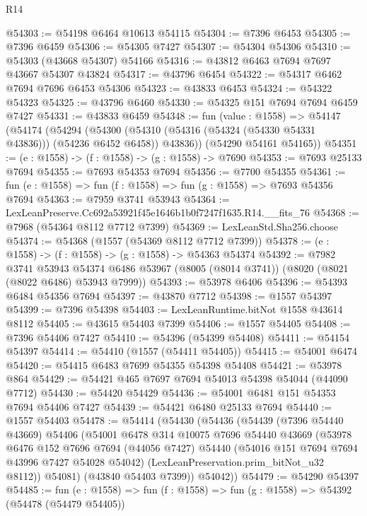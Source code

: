 \begin{lexlean}{R14}
\begin{coremodule}
@54303 := @54198 @6464 @10613 @54115
@54304 := @7396 @6453
@54305 := @7396 @6459
@54306 := @54305 @7427
@54307 := @54304 @54306
@54310 := @54303 (@43668 @54307) @54166
@54316 := @43812 @6463 @7694 @7697 @43667 @54307 @43824
@54317 := @43796 @6454
@54322 := @54317 @6462 @7694 @7696 @6453 @54306
@54323 := @43833 @6453
@54324 := @54322 @54323
@54325 := @43796 @6460
@54330 := @54325 @151 @7694 @7694 @6459 @7427
@54331 := @43833 @6459
@54348 := fun (value : @1558) =>
  @54147
    (@54174
      (@54294
        (@54300 (@54310 (@54316 (@54324 (@54330 @54331 @43836))) (@54236 @6452 @6458)) @43836))
      (@54290 @54161 @54165))
@54351 := (e : @1558) -> (f : @1558) -> (g : @1558) -> @7690
@54353 := @7693 @25133 @7694
@54355 := @7693 @54353 @7694
@54356 := @7700 @54355
@54361 := fun (e : @1558) => fun (f : @1558) => fun (g : @1558) => @7693 @54356 @7694
@54363 := @7959 @3741 @53943
@54364 := LexLeanPreserve.Cc692a53921f45e1646b1b0f7247f1635.R14.__fits_76
@54368 := @7968 (@54364 @8112 @7712 @7399)
@54369 := LexLeanStd.Sha256.choose
@54374 := @54368 (@1557 (@54369 @8112 @7712 @7399))
@54378 := (e : @1558) -> (f : @1558) -> (g : @1558) -> @54363 @54374
@54392 := @7982
    @3741
    @53943
    @54374
    @6486
    @53967
    (@8005 (@8014 @3741))
    (@8020 (@8021 (@8022 @6486) @53943 @7999))
@54393 := @53978 @6406
@54396 := @54393 @6484 @54356 @7694
@54397 := @43870 @7712
@54398 := @1557 @54397
@54399 := @7396 @54398
@54403 := LexLeanRuntime.bitNot @1558 @43614 @8112
@54405 := @43615 @54403 @7399
@54406 := @1557 @54405
@54408 := @7396 @54406 @7427
@54410 := @54396 (@54399 @54408)
@54411 := @54154 @54397
@54414 := @54410 (@1557 (@54411 @54405))
@54415 := @54001 @6474
@54420 := @54415 @6483 @7699 @54355 @54398 @54408
@54421 := @53978 @864
@54429 := @54421 @465 @7697 @7694 @54013 @54398 @54044 (@44090 @7712)
@54430 := @54420 @54429
@54436 := @54001 @6481 @151 @54353 @7694 @54406 @7427
@54439 := @54421 @6480 @25133 @7694
@54440 := @1557 @54403
@54478 := @54414
    (@54430
      (@54436
        (@54439
          (@7396 @54440 @43669)
          @54406
          (@54001
            @6478
            @314
            @10075
            @7696
            @54440
            @43669
            (@53978
              @6476
              @152
              @7696
              @7694
              (@44056 @7427)
              @54440
              (@54016 @151 @7694 @7694 @43996 @7427 @54028 @54042)
              (LexLeanPreservation.prim_bitNot_u32 @8112))
            @54081)
          (@43840 @54403 @7399))
        @54042))
@54479 := @54290 @54397
@54485 := fun (e : @1558) => fun (f : @1558) => fun (g : @1558) => @54392 (@54478 (@54479 @54405))

\end{coremodule}
\end{lexlean}
